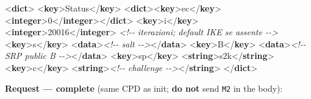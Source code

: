 \documentclass[
  english,
  10pt]{article}
\newenvironment{Shaded}{}{}
\newcommand{\CommentTok}[1]{\textcolor[rgb]{0.38,0.63,0.69}{\textit{#1}}}
\newcommand{\KeywordTok}[1]{\textcolor[rgb]{0.00,0.44,0.13}{\textbf{#1}}}
\newcommand{\NormalTok}[1]{#1}
\begin{document}
\begin{Shaded}
\begin{Highlighting}[]
\NormalTok{\textless{}}\KeywordTok{dict}\NormalTok{\textgreater{}}
\NormalTok{  \textless{}}\KeywordTok{key}\NormalTok{\textgreater{}Status\textless{}/}\KeywordTok{key}\NormalTok{\textgreater{} \textless{}}\KeywordTok{dict}\NormalTok{\textgreater{}\textless{}}\KeywordTok{key}\NormalTok{\textgreater{}ec\textless{}/}\KeywordTok{key}\NormalTok{\textgreater{}\textless{}}\KeywordTok{integer}\NormalTok{\textgreater{}0\textless{}/}\KeywordTok{integer}\NormalTok{\textgreater{}\textless{}/}\KeywordTok{dict}\NormalTok{\textgreater{}}
\NormalTok{  \textless{}}\KeywordTok{key}\NormalTok{\textgreater{}i\textless{}/}\KeywordTok{key}\NormalTok{\textgreater{}  \textless{}}\KeywordTok{integer}\NormalTok{\textgreater{}20016\textless{}/}\KeywordTok{integer}\NormalTok{\textgreater{}   }\CommentTok{\textless{}!{-}{-} iterazioni; default IKE se assente {-}{-}\textgreater{}}
\NormalTok{  \textless{}}\KeywordTok{key}\NormalTok{\textgreater{}s\textless{}/}\KeywordTok{key}\NormalTok{\textgreater{}  \textless{}}\KeywordTok{data}\NormalTok{\textgreater{}}\CommentTok{\textless{}!{-}{-} salt {-}{-}\textgreater{}}\NormalTok{\textless{}/}\KeywordTok{data}\NormalTok{\textgreater{}}
\NormalTok{  \textless{}}\KeywordTok{key}\NormalTok{\textgreater{}B\textless{}/}\KeywordTok{key}\NormalTok{\textgreater{}  \textless{}}\KeywordTok{data}\NormalTok{\textgreater{}}\CommentTok{\textless{}!{-}{-} SRP public B {-}{-}\textgreater{}}\NormalTok{\textless{}/}\KeywordTok{data}\NormalTok{\textgreater{}}
\NormalTok{  \textless{}}\KeywordTok{key}\NormalTok{\textgreater{}sp\textless{}/}\KeywordTok{key}\NormalTok{\textgreater{} \textless{}}\KeywordTok{string}\NormalTok{\textgreater{}s2k\textless{}/}\KeywordTok{string}\NormalTok{\textgreater{}}
\NormalTok{  \textless{}}\KeywordTok{key}\NormalTok{\textgreater{}c\textless{}/}\KeywordTok{key}\NormalTok{\textgreater{}  \textless{}}\KeywordTok{string}\NormalTok{\textgreater{}}\CommentTok{\textless{}!{-}{-} challenge {-}{-}\textgreater{}}\NormalTok{\textless{}/}\KeywordTok{string}\NormalTok{\textgreater{}}
\NormalTok{\textless{}/}\KeywordTok{dict}\NormalTok{\textgreater{}}
\end{Highlighting}
\end{Shaded}

\textbf{Request --- complete} (same CPD as init; \textbf{do not} send
\texttt{M2} in the body):
\end{document}
